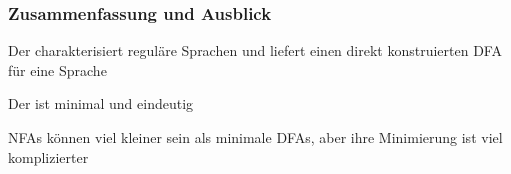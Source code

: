 \documentclass[aspectratio=1610,onlymath]{beamer}
\begin{document}
\begin{frame}\frametitle{Zusammenfassung und Ausblick}

Der  charakterisiert reguläre Sprachen und liefert einen direkt konstruierten DFA für eine Sprache
\bigskip

Der  ist minimal und eindeutig
\bigskip

NFAs können viel kleiner sein als minimale DFAs, aber ihre Minimierung ist viel komplizierter



\end{frame}
\end{document}
